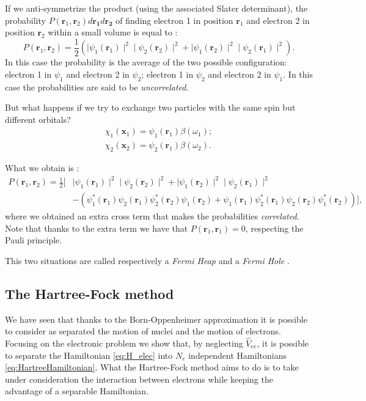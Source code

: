 \documentclass[a4paper,12pt]{article}
\begin{document}
If we anti-symmetrize the product (using the associated Slater determinant), the probability $P(\mathbf{r}_{1},\mathbf{r}_{2}) d\mathbf{r_{1}} d\mathbf{r_{2}}$ of finding electron 1 in position $\mathbf{r}_{1}$ and electron 2 in position $\mathbf{r}_{2}$ within a small volume is equal to \cite[p.52]{Attila}:
\begin{equation*}
	P(\mathbf{r}_{1},\mathbf{r}_{2}) = 
		\frac{1}{2} ( 
			\mid \psi_{1}(\mathbf{r}_1) \mid ^2    
			\mid \psi_{2}(\mathbf{r}_2) \mid ^2   
				+
			\mid \psi_{1}(\mathbf{r}_2) \mid ^2    
			\mid \psi_{2}(\mathbf{r}_1) \mid ^2   
			).
\end{equation*}
In this case the probability is the average of the two possible configuration: electron 1 in $\psi_1$ and electron 2 in $\psi_2$; electron 1 in $\psi_2$ and electron 2 in $\psi_1$.
In this case the probabilities are said to be \textit{uncorrelated}.

But what happens if we try to exchange two particles with the same spin but different orbitals?
\begin{align*}
	\chi_{1}(\mathbf{x}_{1}) = \psi_{1}(\mathbf{r}_{1}) \beta(\omega_{1});\\
	\chi_{2}(\mathbf{x}_{2}) = \psi_{2}(\mathbf{r}_{1}) \beta(\omega_{2}).
\end{align*}

What we obtain is \cite[p.53]{Attila}:
\begin{align*}
	P(\mathbf{r}_{1},\mathbf{r}_{2}) = 
		\frac{1}{2} [ &
			\mid \psi_{1}(\mathbf{r}_1) \mid ^2    
			\mid \psi_{2}(\mathbf{r}_2) \mid ^2   
				+
			\mid \psi_{1}(\mathbf{r}_2) \mid ^2    
			\mid \psi_{2}(\mathbf{r}_1) \mid ^2   
\\
			& - ( \psi_{1}^*(\mathbf{r}_1) \psi_{2}(\mathbf{r}_1) \psi_{2}^*(\mathbf{r}_2) \psi_{1}(\mathbf{r}_2)
			 + \psi_{1}(\mathbf{r}_1) \psi_{2}^*(\mathbf{r}_1) \psi_{2}(\mathbf{r}_2) \psi_{1}^*(\mathbf{r}_2))],
\end{align*}
where we obtained an extra cross term that makes the probabilities \textit{correlated}. Note that thanks to the extra term we have that $P(\mathbf{r}_{1},\mathbf{r}_{1}) = 0$, respecting the Pauli principle.

This two situations are called respectively a \textit{Fermi Heap} and a \textit{Fermi Hole} \cite{Dan}.


\subsection{The Hartree-Fock method} \label{sec:HF}
We have seen that thanks to the Born-Oppenheimer approximation it is possible to consider as separated the motion of nuclei and the motion of electrons. 
Focusing on the electronic problem we show that, by neglecting $\hat{V}_{ee}$, it is possible to separate the Hamiltonian \eqref{eq:H_elec} into $N_e$ independent Hamiltonians \eqref{eq:HartreeHamiltonian}.
What the Hartree-Fock method aims to do is to take under consideration the interaction between electrons while keeping the advantage of a separable Hamiltonian.
\end{document}
